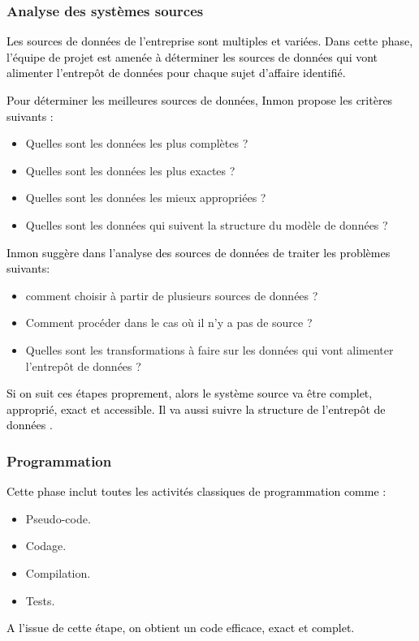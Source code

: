 \documentclass[a4paper,12pt]{report}
\begin{document}
\subsubsection{Analyse des systèmes sources }
\textcolor{black}{Les sources de données de l’entreprise sont multiples et variées. Dans cette phase, l’équipe de projet est amenée à déterminer les sources de données qui vont alimenter l’entrepôt de données pour chaque sujet d’affaire identifié.}

\textcolor{black}{Pour déterminer les meilleures sources de données, Inmon propose les critères suivants :}

\begin{itemize}
\item 	Quelles sont les données les plus complètes ?
\item 	Quelles sont les données les plus exactes ?
\item	Quelles sont les données les mieux appropriées ?
\item	Quelles sont les données qui suivent la structure du modèle de données ?

\end{itemize}
\textcolor{black}{Inmon suggère dans l’analyse des sources de données de traiter les problèmes suivants:}

\begin{itemize}

\item	comment choisir à partir de plusieurs sources de données ?
\item	Comment procéder dans le cas où il n’y a pas de source ?
\item	Quelles sont les transformations à faire sur les données qui vont alimenter l’entrepôt de données ?

\end{itemize}

\textcolor{black}{Si on suit ces étapes proprement, alors le système source va être complet, approprié, exact et accessible. Il va aussi suivre la structure de l’entrepôt de données \citep{inmon2002building}.}

\subsubsection{Programmation}
\textcolor{black}{Cette phase inclut toutes les activités classiques de programmation comme :}

\begin{itemize}
\item	Pseudo-code.
\item	Codage.
\item	Compilation.
\item	Tests.
\end{itemize}
\textcolor{black}{A l’issue de cette étape, on obtient un code efficace, exact et complet.}
\end{document}
